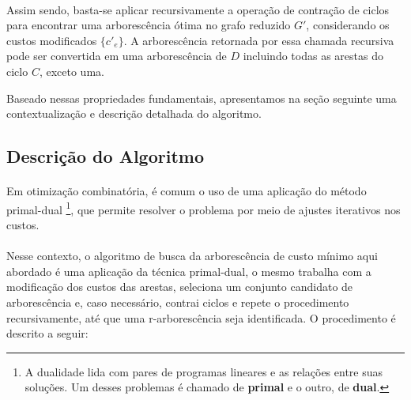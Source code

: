 \documentclass[12pt,a4paper]{article}
\begin{document}
\paragraph{}
Assim sendo, basta-se aplicar recursivamente a operação de contração de ciclos para encontrar uma arborescência ótima no grafo reduzido \( G' \), considerando os custos modificados \( \{ c'_e \} \). A arborescência retornada por essa chamada recursiva pode ser convertida em uma arborescência de \( D \) incluindo todas as arestas do ciclo \( C \), exceto uma.

Baseado nessas propriedades fundamentais, apresentamos na seção seguinte uma contextualização e descrição detalhada do algoritmo.

\subsection{Descrição do Algoritmo}

\paragraph{}
Em otimização combinatória, é comum o uso de uma aplicação do método primal-dual \footnote{
A dualidade lida com pares de programas lineares e as relações entre suas soluções. Um desses problemas é chamado de \textbf{primal} e o outro, de \textbf{dual}.}, que permite resolver o problema por meio de ajustes iterativos nos custos.





\paragraph{}
Nesse contexto, o algoritmo de busca da arborescência de custo mínimo aqui abordado é uma aplicação da técnica primal-dual, o mesmo trabalha com a modificação dos custos das arestas, seleciona um conjunto candidato de arborescência e, caso necessário, contrai ciclos e repete o procedimento recursivamente, até que uma r-arborescência seja identificada. O procedimento é descrito a seguir:
\end{document}
